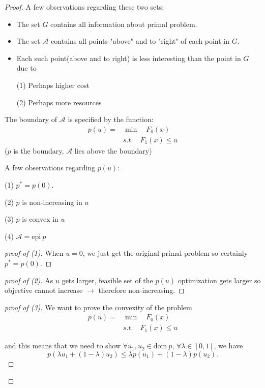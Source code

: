 \begin{proof}
A few observations regarding these two sets:
\begin{itemize}
	\item The set $G$ contains all information about primal problem.
	
	\item The set $\mathcal{A}$ contains all points "above" and to "right" of each point in $G$.
	
	\item Each such point(above and to right) is less interesting than the point in $G$ due to  
	
	(1) Perhaps higher cost
	
	(2) Perhaps more resources
\end{itemize}

The boundary of $\mathcal{A}$ is specified by the function:
\begin{align*}
	p(u) = &\min \quad F_0(x)\\
	&s.t. \quad F_1(x) \leq u
\end{align*}
($p$ is the boundary, $\mathcal{A}$ lies above the boundary)

A few observations regarding $p(u)$:

	(1) $p^* = p(0)$.
	
	(2) $p$ is non-increasing in $u$
	
	(3) $p$ is convex in $u$
	
	(4) $\mathcal{A} = \text{epi}\ p$

\begin{proof}[proof of (1)]
	When $u=0$, we just get the original primal problem so certainly $p^* = p(0)$.
\end{proof}

\begin{proof}[proof of (2)]
		As $u$ gets larger, feasible set of the $p(u)$ optimization gets larger so objective cannot increase $\rightarrow$ therefore non-increasing.
\end{proof}

\begin{proof}[proof of (3)]
	We want to prove the convexity of the problem
	\begin{align*}
		p(u) = &\min \quad F_0(x)\\
		&s.t. \quad F_1(x) \leq u
	\end{align*}
	
    and this means that we need to show $\forall u_1, u_2\in \text{dom}\ p$, $\forall \lambda\in [0,1]$, we have
	$$p(\lambda u_1 + (1-\lambda)u_2) \leq \lambda  p(u_1) + (1-\lambda)p(u_2).$$
	

\end{proof}
\end{proof}
